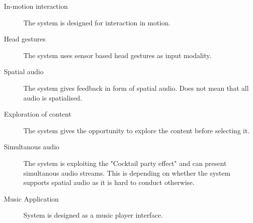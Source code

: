 \begin{description}
\item[In-motion interaction]
The system is designed for interaction in motion.

\item[Head gestures]
The system uses sensor based head gestures as input modality.

\item[Spatial audio]
The system gives feedback in form of spatial audio. Does not mean that all audio is spatialised.

\item[Exploration of content]
The system gives the opportunity to explore the content before selecting it.

\item[Simultanous audio]
The system is exploiting the "Cocktail party effect" and can present simultanous audio streams. This is depending on whether the system supports spatial audio as it is hard to conduct otherwise.

\item[Music Application]
System is designed as a music player interface.
\end{description}

